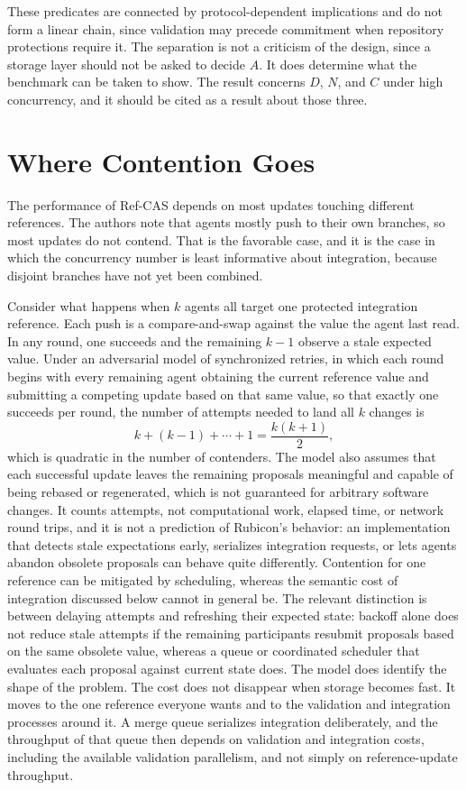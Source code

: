 \documentclass[11pt]{article}
\theoremstyle{definition}
\theoremstyle{plain}
\begin{document}
These predicates are connected by protocol-dependent implications and do not form a linear chain, since validation may precede commitment when repository protections require it. The separation is not a criticism of the design, since a storage layer should not be asked to decide $A$. It does determine what the benchmark can be taken to show. The result concerns $D$, $N$, and $C$ under high concurrency, and it should be cited as a result about those three.

\section{Where Contention Goes}

The performance of Ref-CAS depends on most updates touching different references. The authors note that agents mostly push to their own branches, so most updates do not contend. That is the favorable case, and it is the case in which the concurrency number is least informative about integration, because disjoint branches have not yet been combined.

Consider what happens when $k$ agents all target one protected integration reference. Each push is a compare-and-swap against the value the agent last read. In any round, one succeeds and the remaining $k-1$ observe a stale expected value. Under an adversarial model of synchronized retries, in which each round begins with every remaining agent obtaining the current reference value and submitting a competing update based on that same value, so that exactly one succeeds per round, the number of attempts needed to land all $k$ changes is
\[
k + (k-1) + \cdots + 1 = \frac{k(k+1)}{2},
\]
which is quadratic in the number of contenders. The model also assumes that each successful update leaves the remaining proposals meaningful and capable of being rebased or regenerated, which is not guaranteed for arbitrary software changes. It counts attempts, not computational work, elapsed time, or network round trips, and it is not a prediction of Rubicon's behavior: an implementation that detects stale expectations early, serializes integration requests, or lets agents abandon obsolete proposals can behave quite differently. Contention for one reference can be mitigated by scheduling, whereas the semantic cost of integration discussed below cannot in general be. The relevant distinction is between delaying attempts and refreshing their expected state: backoff alone does not reduce stale attempts if the remaining participants resubmit proposals based on the same obsolete value, whereas a queue or coordinated scheduler that evaluates each proposal against current state does. The model does identify the shape of the problem. The cost does not disappear when storage becomes fast. It moves to the one reference everyone wants and to the validation and integration processes around it. A merge queue serializes integration deliberately, and the throughput of that queue then depends on validation and integration costs, including the available validation parallelism, and not simply on reference-update throughput.
\end{document}
